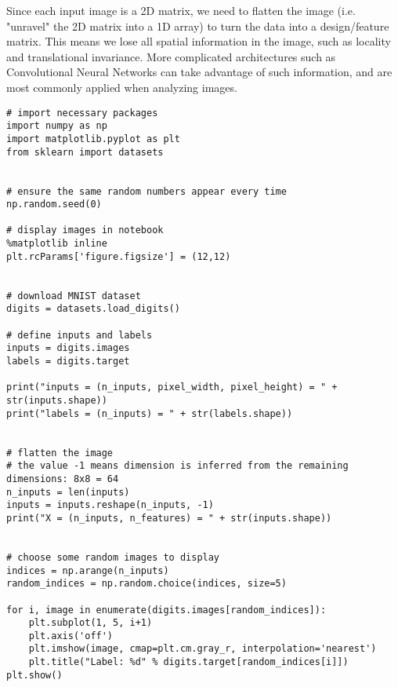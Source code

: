 Since each input image is a 2D matrix, we need to flatten the image
(i.e. "unravel" the 2D matrix into a 1D array) to turn the data into a
design/feature matrix. This means we lose all spatial information in the
image, such as locality and translational invariance. More complicated
architectures such as Convolutional Neural Networks can take advantage
of such information, and are most commonly applied when analyzing
images.












































\begin{verbatim}
# import necessary packages
import numpy as np
import matplotlib.pyplot as plt
from sklearn import datasets


# ensure the same random numbers appear every time
np.random.seed(0)

# display images in notebook
%matplotlib inline
plt.rcParams['figure.figsize'] = (12,12)


# download MNIST dataset
digits = datasets.load_digits()

# define inputs and labels
inputs = digits.images
labels = digits.target

print("inputs = (n_inputs, pixel_width, pixel_height) = " + str(inputs.shape))
print("labels = (n_inputs) = " + str(labels.shape))


# flatten the image
# the value -1 means dimension is inferred from the remaining dimensions: 8x8 = 64
n_inputs = len(inputs)
inputs = inputs.reshape(n_inputs, -1)
print("X = (n_inputs, n_features) = " + str(inputs.shape))


# choose some random images to display
indices = np.arange(n_inputs)
random_indices = np.random.choice(indices, size=5)

for i, image in enumerate(digits.images[random_indices]):
    plt.subplot(1, 5, i+1)
    plt.axis('off')
    plt.imshow(image, cmap=plt.cm.gray_r, interpolation='nearest')
    plt.title("Label: %d" % digits.target[random_indices[i]])
plt.show()

\end{verbatim}



